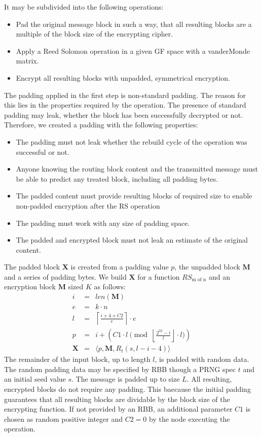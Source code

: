 It may be subdivided into the following operations:
\begin{itemize}
	\item Pad the original message block in such a way, that all resulting blocks are a multiple of the block size of the encrypting cipher.
	\item Apply a Reed Solomon operation in a given GF space with a vanderMonde matrix.
	\item Encrypt all resulting blocks with unpadded, symmetrical encryption.
\end{itemize}

The padding applied in the first step is non-standard padding. The reason for this lies in the properties required by the operation. The presence of standard padding may leak, whether the block has been successfully decrypted or not. Therefore, we created a padding with the following properties:
\begin{itemize}
	\item The padding must not leak whether the rebuild cycle of the operation was successful or not.
	\item Anyone knowing the routing block content and the transmitted message must be able to predict any treated block, including all padding bytes.
	\item The padded content must provide resulting blocks of required size to enable non-padded encryption after the RS operation
	\item The padding must work with any size of padding space.
	\item The padded and encrypted block must not leak an estimate of the original content.
\end{itemize}

The padded block $\mathbf{X}$ is created from a padding value $p$, the unpadded block $\mathbf{M}$ and a series of padding bytes. We build $\mathbf{X}$ for a function $RS_{\text{m of n}}$ and an encryption block $\mathbf{M}$ sized $K$ as follows:
\begin{eqnarray}
i          & = & len(\mathbf{M})\\
e          & = & k \cdot n\\
l          & = & \left\lceil\frac{i + 4 + C2 }{e}\right\rceil\cdot e\\
p          & = & i + \left( C1 \cdot l \pmod{\left\lfloor\frac{2^{32}-i}{l}\right\rfloor\cdot l}\right)\\
\mathbf{X} & = & \langle p,\mathbf{M},R_{t}\left(s,l-i-4\right)\rangle
\end{eqnarray}    
The remainder of the input block, up to length $l$, is padded with random data. The random padding data may be specified by RBB though a PRNG spec $t$ and an initial seed value $s$. The message is padded up to size $L$. All resulting, encrypted blocks do not require any padding. This baecause the initial padding guarantees that all resulting blocks are dividable by the block size of the encrypting function. If not provided by an RBB, an additional parameter $C1$ is chosen as random positive integer and $C2=0$  by the node executing the operation.

